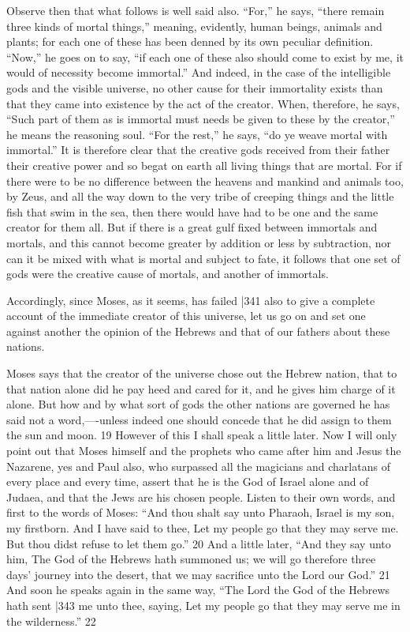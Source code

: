 Observe then that what follows is well said also. ``For,'' he says, ``there remain three kinds of mortal things,'' meaning, evidently, human beings, animals and plants; for each one of these has been denned by its own peculiar definition. ``Now,'' he goes on to say, ``if each one of these also should come to exist by me, it would of necessity become immortal.'' And indeed, in the case of the intelligible gods and the visible universe, no other cause for their immortality exists than that they came into existence by the act of the creator. When, therefore, he says, ``Such part of them as is immortal must needs be given to these by the creator,'' he means the reasoning soul. ``For the rest,'' he says, ``do ye weave mortal with immortal.'' It is therefore clear that the creative gods received from their father their creative power and so begat on earth all living things that are mortal. For if there were to be no difference between the heavens and mankind and animals too, by Zeus, and all the way down to the very tribe of creeping things and the little fish that swim in the sea, then there would have had to be one and the same creator for them all. But if there is a great gulf fixed between immortals and mortals, and this cannot become greater by addition or less by subtraction, nor can it be mixed with what is mortal and subject to fate, it follows that one set of gods were the creative cause of mortals, and another of immortals.

Accordingly, since Moses, as it seems, has failed |341
also to give a complete account of the immediate creator of this universe, let us go on and set one against another the opinion of the Hebrews and that of our fathers about these nations.

Moses says that the creator of the universe chose out the Hebrew nation, that to that nation alone did he pay heed and cared for it, and he gives him charge of it alone. But how and by what sort of gods the other nations are governed he has said not a word,----unless indeed one should concede that he did assign to them the sun and moon. 19 However of this I shall speak a little later. Now I will only point out that Moses himself and the prophets who came after him and Jesus the Nazarene, yes and Paul also, who surpassed all the magicians and charlatans of every place and every time, assert that he is the God of Israel alone and of Judaea, and that the Jews are his chosen people. Listen to their own words, and first to the words of Moses: ``And thou shalt say unto Pharaoh, Israel is my son, my firstborn. And I have said to thee, Let my people go that they may serve me. But thou didst refuse to let them go.''
20 And a little later, ``And they say unto him, The God of the Hebrews hath summoned us; we will go therefore three days' journey into the desert, that we may sacrifice unto the Lord our God.''
21 And soon he speaks again in the same way, ``The Lord the God of the Hebrews hath sent
|343 me unto thee, saying, Let my people go that they may serve me in the wilderness.''
22

